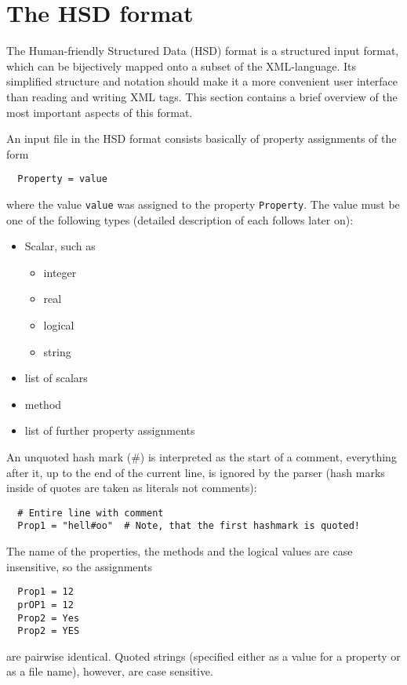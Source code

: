 \chapter{The HSD format}
\label{sec:hsd}

The Human-friendly Structured Data (HSD) format is a structured input
format, which can be bijectively mapped onto a subset of the
XML-language. Its simplified structure and notation should make it a
more convenient user interface than reading and writing XML tags. This
section contains a brief overview of the most important aspects of
this format.

An input file in the HSD format consists basically of property
assignments of the form
\begin{verbatim}
  Property = value
\end{verbatim}
where the value \verb|value| was assigned to the property
\verb|Property|.  The value must be one of the following types
(detailed description of each follows later on):
\begin{itemize}
\item Scalar, such as
  \begin{itemize}
  \item integer
  \item real 
  \item logical
  \item string
  \end{itemize}
\item list of scalars
\item method
\item list of further property assignments
\end{itemize}

An unquoted hash mark (\#) is interpreted as the start of a comment,
everything after it, up to the end of the current line, is ignored by
the parser (hash marks inside of quotes are taken as literals not
comments):
\begin{verbatim}
  # Entire line with comment
  Prop1 = "hell#oo"  # Note, that the first hashmark is quoted!
\end{verbatim}
The name of the properties, the methods and the logical values are case
insensitive, so the assignments
\begin{verbatim}
  Prop1 = 12
  prOP1 = 12
  Prop2 = Yes
  Prop2 = YES
\end{verbatim}
are pairwise identical. Quoted strings (specified either as a value
for a property or as a file name), however, are case sensitive.

